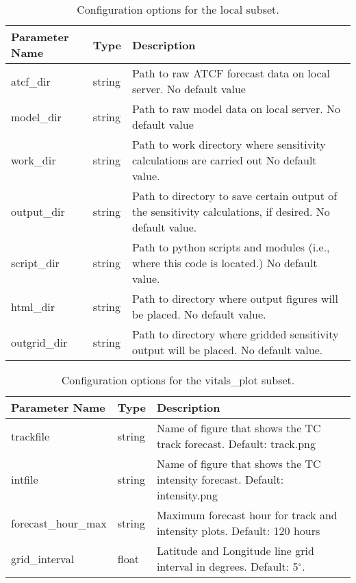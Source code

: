 \documentclass[psfig,12pt]{article}
\begin{document}
\begin{table}[H]
\caption{Configuration options for the local subset.}
\begin{center}
\begin{tabular}{|p{1.25in}|p{0.5in}|p{4.5in}|}
\hline
Parameter Name & Type & Description \\ \hline\hline
atcf\_dir & string & Path to raw ATCF forecast data on local server.  No default value \\ \hline
model\_dir & string & Path to raw model data on local server.  No default value \\ \hline
work\_dir & string & Path to work directory where sensitivity calculations are carried out
No default value. \\ \hline
output\_dir & string & Path to directory to save certain output of the sensitivity 
calculations, if desired.  No default value.  \\ \hline
script\_dir & string & Path to python scripts and modules (i.e., where this code is located.)
No default value. \\ \hline
html\_dir & string & Path to directory where output figures will be placed.
No default value.  \\ \hline
outgrid\_dir & string & Path to directory where gridded sensitivity output will be placed.
No default value.  \\ \hline
\end{tabular}
\end{center}
\end{table}

\begin{table}[H]  
\caption{Configuration options for the vitals\_plot subset.}
\begin{center}
\begin{tabular}{|p{1.25in}|p{0.5in}|p{4.5in}|}
\hline
Parameter Name & Type & Description \\ \hline \hline
trackfile & string & Name of figure that shows the TC track forecast.  Default:  track.png \\ \hline
intfile & string & Name of figure that shows the TC intensity forecast.  Default:  intensity.png \\ \hline
forecast\_hour\_max & string & Maximum forecast hour for track and intensity plots.  
Default:  120 hours \\ \hline
grid\_interval & float & Latitude and Longitude line grid interval in degrees.  
Default:  5$^{\circ}$.  \\ \hline
\end{tabular}
\end{center}
\end{table}
\end{document}
